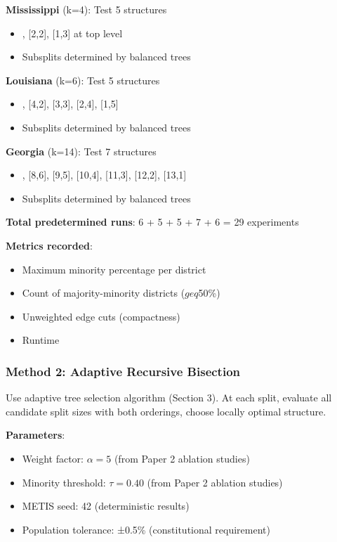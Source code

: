 \textbf{Mississippi} (k=4): Test 5 structures
\begin{itemize}
\item [3,1], [2,2], [1,3] at top level
\item Subsplits determined by balanced trees
\end{itemize}

\textbf{Louisiana} (k=6): Test 5 structures
\begin{itemize}
\item [5,1], [4,2], [3,3], [2,4], [1,5]
\item Subsplits determined by balanced trees
\end{itemize}

\textbf{Georgia} (k=14): Test 7 structures
\begin{itemize}
\item [7,7], [8,6], [9,5], [10,4], [11,3], [12,2], [13,1]
\item Subsplits determined by balanced trees
\end{itemize}

\textbf{Total predetermined runs}: 6 + 5 + 5 + 7 + 6 = 29 experiments

\textbf{Metrics recorded}:
\begin{itemize}
\item Maximum minority percentage per district
\item Count of majority-minority districts ($geq$50\%)
\item Unweighted edge cuts (compactness)
\item Runtime
\end{itemize}

\subsubsection{Method 2: Adaptive Recursive Bisection}

Use adaptive tree selection algorithm (Section 3). At each split, evaluate all candidate split sizes with both orderings, choose locally optimal structure.

\textbf{Parameters}:
\begin{itemize}
\item Weight factor: $\alpha = 5$ (from Paper 2 ablation studies)
\item Minority threshold: $\tau = 0.40$ (from Paper 2 ablation studies)
\item METIS seed: 42 (deterministic results)
\item Population tolerance: ±0.5\% (constitutional requirement)
\end{itemize}

